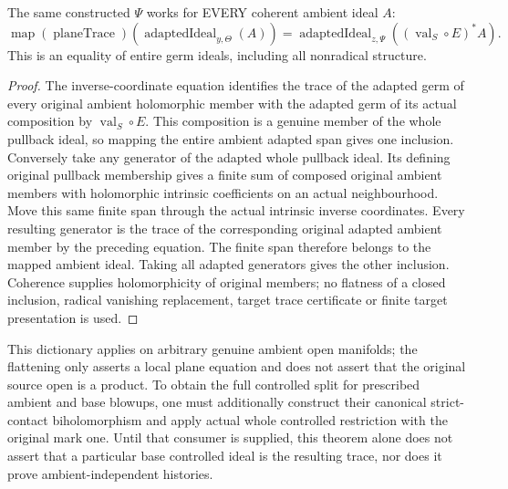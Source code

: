 \begin{theorem}
\label{hir:disjoint-matched-whole-coherent-trace}
\leanok
The same constructed $\Psi$ works for EVERY coherent ambient ideal $A$:
\[
 \operatorname{map}(\operatorname{planeTrace})
       (\operatorname{adaptedIdeal}_{y,\Theta}(A))
 =\operatorname{adaptedIdeal}_{z,\Psi}
       ((\operatorname{val}_S\circ E)^*A).
\]
This is an equality of entire germ ideals, including all nonradical structure.
\end{theorem}
\begin{proof}
The inverse-coordinate equation identifies the trace of the adapted germ of
every original ambient holomorphic member with the adapted germ of its actual
composition by $\operatorname{val}_S\circ E$. This composition is a genuine
member of the whole pullback ideal, so mapping the entire ambient adapted
span gives one inclusion. Conversely take any generator of the adapted whole
pullback ideal. Its defining original pullback membership gives a finite sum
of composed original ambient members with holomorphic intrinsic coefficients
on an actual neighbourhood. Move this same finite span through the actual
intrinsic inverse coordinates. Every resulting generator is the trace of the
corresponding original adapted ambient member by the preceding equation.
The finite span therefore belongs to the mapped ambient ideal. Taking all
adapted generators gives the other inclusion. Coherence supplies holomorphicity
of original members; no flatness of a closed inclusion, radical vanishing
replacement, target trace certificate or finite target presentation is used.
\end{proof}

\begin{remark}
This dictionary applies on arbitrary genuine ambient open manifolds; the
flattening only asserts a local plane equation and does not assert that the
original source open is a product. To obtain the full controlled split for
prescribed ambient and base blowups, one must additionally construct their
canonical strict-contact biholomorphism and apply actual whole controlled
restriction with the original mark one. Until that consumer is supplied,
this theorem alone does not assert that a particular base controlled ideal
is the resulting trace, nor does it prove ambient-independent histories.
\end{remark}
